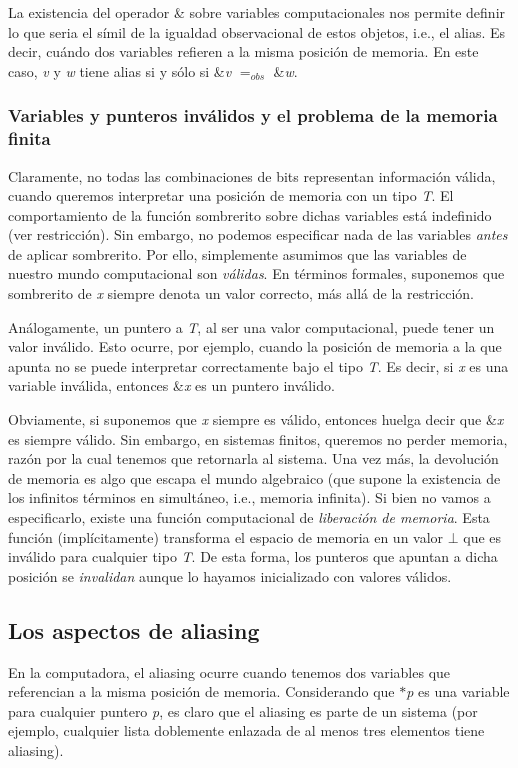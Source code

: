La existencia del operador \& sobre variables computacionales nos permite definir lo que seria el símil de la igualdad observacional de estos objetos, i.\+e., el alias. Es decir, cuándo dos variables refieren a la misma posición de memoria. En este caso, {\itshape v} y {\itshape w} tiene alias si y sólo si \&{\itshape v} $=_{obs}$ \&{\itshape w}.\hypertarget{Aliasing_sec-invalido}{}\subsubsection{Variables y punteros inválidos y el problema de la memoria finita}\label{Aliasing_sec-invalido}
Claramente, no todas las combinaciones de bits representan información válida, cuando queremos interpretar una posición de memoria con un tipo {\itshape T}. El comportamiento de la función sombrerito sobre dichas variables está indefinido (ver restricción). Sin embargo, no podemos especificar nada de las variables {\itshape antes} de aplicar sombrerito. Por ello, simplemente asumimos que las variables de nuestro mundo computacional son {\itshape válidas}. En términos formales, suponemos que sombrerito de {\itshape x} siempre denota un valor correcto, más allá de la restricción.

Análogamente, un puntero a {\itshape T}, al ser una valor computacional, puede tener un valor inválido. Esto ocurre, por ejemplo, cuando la posición de memoria a la que apunta no se puede interpretar correctamente bajo el tipo {\itshape T}. Es decir, si {\itshape x} es una variable inválida, entonces \&{\itshape x} es un puntero inválido.

Obviamente, si suponemos que {\itshape x} siempre es válido, entonces huelga decir que \&{\itshape x} es siempre válido. Sin embargo, en sistemas finitos, queremos no perder memoria, razón por la cual tenemos que retornarla al sistema. Una vez más, la devolución de memoria es algo que escapa el mundo algebraico (que supone la existencia de los infinitos términos en simultáneo, i.\+e., memoria infinita). Si bien no vamos a especificarlo, existe una función computacional de {\itshape liberación de memoria}. Esta función (implícitamente) transforma el espacio de memoria en un valor $\bot$ que es inválido para cualquier tipo {\itshape T}. De esta forma, los punteros que apuntan a dicha posición se {\itshape invalidan} aunque lo hayamos inicializado con valores válidos.\hypertarget{Aliasing_sec-aliasing}{}\subsection{Los aspectos de aliasing}\label{Aliasing_sec-aliasing}
En la computadora, el aliasing ocurre cuando tenemos dos variables que referencian a la misma posición de memoria. Considerando que $\ast${\itshape p} es una variable para cualquier puntero {\itshape p}, es claro que el aliasing es parte de un sistema (por ejemplo, cualquier lista doblemente enlazada de al menos tres elementos tiene aliasing).

